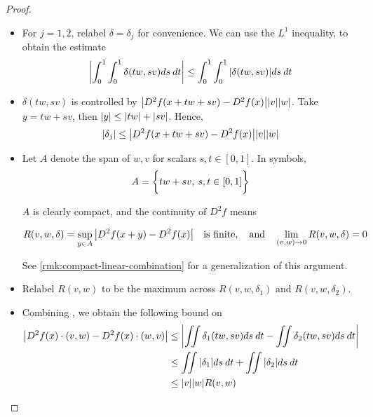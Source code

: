 \documentclass[../main-manifolds.tex]{subfiles}
\begin{document}
\begin{proof}
\begin{note}
    \begin{itemize}
        \item For $j=1,2$, relabel $\delta = \delta_j$ for convenience. We can use the $L^1$ inequality, to obtain the estimate
        \begin{equation}\label{second-derivative-step2}
            \abs{ \int_0^1\int_0^1\delta(tw,sv)ds\: dt} \leq \int_0^1\int_0^1\abs{\delta(tw,sv)}ds\: dt
        \end{equation}
        \item $\delta(tw,sv)$ is controlled by $\abs{D^2f(x + tw + sv) - D^2f(x)}\abs{v}\abs{w}$. Take $y = tw+sv$, then $\abs{y} \leq \abs{tw} + \abs{sv}$. Hence,
        \begin{equation}\label{second-derivative-control-on-rhs}
            \vert\delta_j\vert\leq\abs{D^2 f(x + tw + sv) - D^2f(x)}\abs{v}\abs{w}
        \end{equation}
        \item Let $A$ denote the span of $w,v$ for scalars $s,t\in[0,1]$. In symbols,
        \[
            A = \biggl\{{tw+sv,\: s,t\in [0,1]}\biggr\}
        \]

        $A$ is clearly compact, and the continuity of $D^2f$ means 
        
        \begin{equation}\label{second-derivative-R}
        R(v,w,\delta) = \sup_{y\in A}\abs{D^2f(x + y) - D^2f(x)}\quad\text{is finite},\qqtext{and}\lim_{(v,w)\to 0}R(v,w,\delta)=0
        \end{equation}
        
        See \cref{rmk:compact-linear-combination} for a generalization of this argument.
        
        \item Relabel $R(v,w)$ to be the maximum across $R(v,w,\delta_1)$ and $R(v,w,\delta_2)$. 
        \item Combining , we obtain the following bound on 
        \begin{align}
            \abs{D^2f(x)\cdot(v,w) - D^2f(x)\cdot(w,v)} &\leq \abs{\iint\delta_1(tw,sv) ds\: dt - \iint\delta_2(tw,sv)ds\: dt}\nonumber\\
            &\leq \iint\abs{\delta_1}ds\: dt + \iint\abs{\delta_2}ds\: dt\nonumber \\
            &\leq \abs{v}\abs{w}R(v,w)\label{second-derivative-step3}
        \end{align}
    \end{itemize}


\end{note}
\end{proof}
\end{document}
